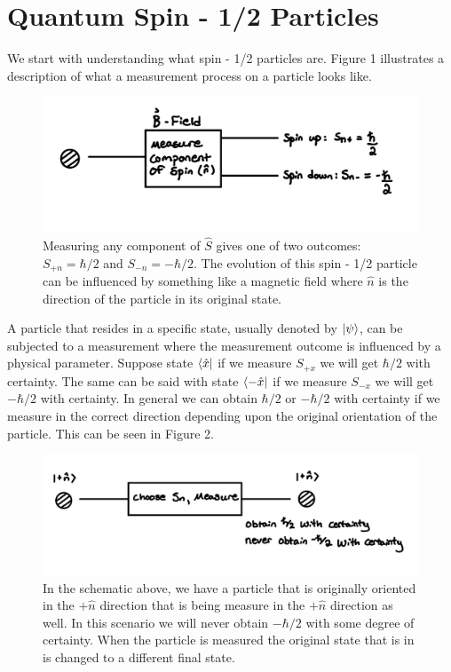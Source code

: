 \documentclass[twocolumn]{article}
\begin{document}
\section*{Quantum Spin - 1/2 Particles}
We start with understanding what spin - 1/2 particles are. Figure 1 illustrates a description of what a measurement process on a particle looks like.
\newpage
\begin{figure}[htbp]
\begin{center}
\includegraphics[width=1.00\linewidth]{Spin-In-Magnetic-Field.jpg}
\caption{Measuring any component of $\hat{S}$ gives one of two outcomes: $S_{+n}=\hbar/2$ and $S_{-n}=-\hbar/2$. The evolution of this spin - 1/2 particle can be influenced by something like a magnetic field where $\hat{n}$ is the direction of the particle in its original state.}
\end{center}
\end{figure}
A particle that resides in a specific state, usually denoted by $\ket{\psi}$, can be subjected to a measurement where the measurement outcome is influenced by a physical parameter. Suppose state $\bra{\hat{x}}$ if we measure $S_{+x}$ we will get $\hbar/2$ with certainty. The same can be said with state $\bra{-\hat{x}}$ if we measure $S_{-x}$ we will get $-\hbar/2$ with                                                                                 certainty. In general we can obtain $\hbar/2$ or $-\hbar/2$ with certainty if we measure in the correct direction depending upon the original orientation of the particle. This can be seen in Figure 2.
\begin{figure}[htbp]
\begin{center}
\includegraphics[width=1.00\linewidth]{Spin-With-Certainty.jpg}
\caption{In the schematic above, we have a particle that is originally oriented in the $+\hat{n}$ direction that is being measure in the $+\hat{n}$ direction as well. In this scenario we will never obtain $-\hbar/2$ with some degree of certainty. When the particle is measured the original state that is in is changed to a different final state.}
\end{center}
\end{figure}
\end{document}
